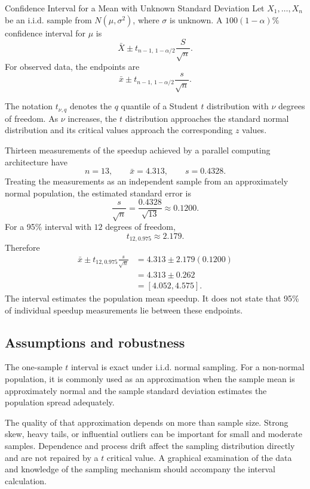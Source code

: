 \begin{theorem}{Confidence Interval for a Mean with Unknown Standard Deviation}
Let $X_1,\ldots,X_n$ be an i.i.d. sample from $N(\mu,\sigma^2)$, where $\sigma$ is unknown. A $100(1-\alpha)\%$ confidence interval for $\mu$ is
\[
    \bar X
      \pm
      t_{n-1,\,1-\alpha/2}\frac{S}{\sqrt n}.
\]
For observed data, the endpoints are
\[
    \bar x
      \pm
      t_{n-1,\,1-\alpha/2}\frac{s}{\sqrt n}.
\]
\end{theorem}

The notation $t_{\nu,q}$ denotes the $q$ quantile of a Student $t$ distribution with $\nu$ degrees of freedom. As $\nu$ increases, the $t$ distribution approaches the standard normal distribution and its critical values approach the corresponding $z$ values.

\begin{example}\par
Thirteen measurements of the speedup achieved by a parallel computing architecture have
\[
    n=13,
    \qquad
    \bar x=4.313,
    \qquad
    s=0.4328.
\]
Treating the measurements as an independent sample from an approximately normal population, the estimated standard error is
\[
    \frac{s}{\sqrt n}
      =\frac{0.4328}{\sqrt{13}}
      \approx0.1200.
\]
For a 95\% interval with $12$ degrees of freedom,
\[
    t_{12,0.975}\approx2.179.
\]
Therefore
\[
\begin{aligned}
    \bar x\pm t_{12,0.975}\frac{s}{\sqrt n}
      &=4.313\pm2.179(0.1200)\\
      &=4.313\pm0.262\\
      &=[4.052,4.575].
\end{aligned}
\]
The interval estimates the population mean speedup. It does not state that 95\% of individual speedup measurements lie between these endpoints.
\end{example}

\subsection{Assumptions and robustness}

The one-sample $t$ interval is exact under i.i.d. normal sampling. For a non-normal population, it is commonly used as an approximation when the sample mean is approximately normal and the sample standard deviation estimates the population spread adequately.

The quality of that approximation depends on more than sample size. Strong skew, heavy tails, or influential outliers can be important for small and moderate samples. Dependence and process drift affect the sampling distribution directly and are not repaired by a $t$ critical value. A graphical examination of the data and knowledge of the sampling mechanism should accompany the interval calculation.

